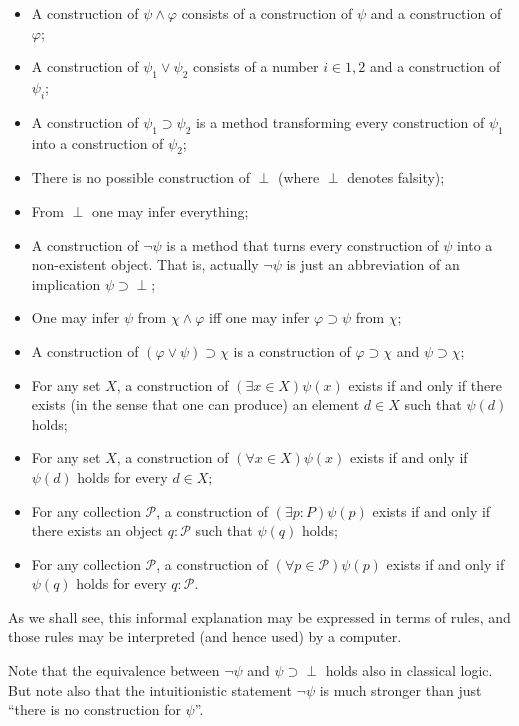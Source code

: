 \begin{itemize}
\item A construction of $\psi\wedge\varphi$ consists of a construction of $\psi$
  and a construction of $\varphi$;
\item A construction of $\psi_{1} \vee \psi_{2}$ consists of a number
  $i \in {1, 2}$ and a construction of $\psi_{i}$;
\item A construction of $\psi_{1} \supset \psi_{2}$ is a method transforming
  every construction of $\psi_{1}$ into a construction of $\psi_{2}$;
\item There is no possible construction of $\perp$ (where $\perp$ denotes
  falsity);
\item From $\perp$ one may infer everything;
\item A construction of $\neg\psi$ is a method that turns every construction of
  $\psi$ into a non-existent object. That is, actually $\neg\psi$ is just an
  abbreviation of an implication $\psi \supset \perp$;
\item One may infer $\psi$ from $\chi\wedge\varphi$ iff one may infer
  $\varphi \supset \psi$ from $\chi$;
\item A construction of $(\varphi \vee \psi) \supset \chi$ is a construction of
  $\varphi \supset \chi$ and $\psi \supset \chi$;
\item For any set $X$, a construction of $(\exists x \in X)\psi(x)$ exists if
  and only if there exists (in the sense that one can produce) an element
  $d \in X$ such that $\psi(d)$ holds;
\item For any set $X$, a construction of $(\forall x \in X)\psi(x)$ exists if
  and only if $\psi(d)$ holds for every $d \in X$;
\item For any collection $\mathcal{P}$, a construction of
  $(\exists p : P)\psi(p)$ exists if and only if there exists an object
  $q : \mathcal{P}$ such that $\psi(q)$ holds;
\item For any collection $\mathcal{P}$, a construction of
  $(\forall p \in \mathcal{P})\psi(p)$ exists if and only if $\psi(q)$ holds for
  every $q : \mathcal{P}$.
\end{itemize}

As we shall see, this informal explanation may be expressed in terms of rules,
and those rules may be interpreted (and hence used) by a computer.

Note that the equivalence between $\neg\psi$ and $\psi\supset\perp$ holds also
in classical logic. But note also that the intuitionistic statement $\neg\psi$
is much stronger than just ``there is no construction for $\psi$''.

